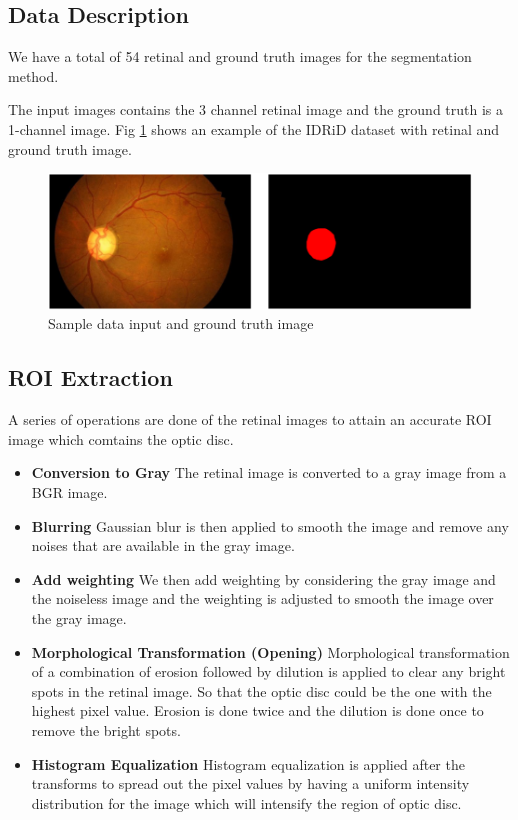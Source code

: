 \documentclass[conference]{IEEEtran}
\begin{document}
\subsection{Data Description}
\label{ssec:describe}
We have a total of 54 retinal and ground truth images for the segmentation method.

\par
The input images contains the 3 channel retinal image and the ground truth is a 1-channel image. Fig \ref{fig:example} shows an example of the IDRiD dataset with retinal and ground truth image.

\par              
\begin{figure}[H]
	\centering
	\includegraphics[width=\linewidth]{images/example.PNG}
	\caption{Sample data input and ground truth image}
	\label{fig:example}
\end{figure}

\subsection{ROI Extraction}
\label{ssec:roi}

A series of operations are done of the retinal images to attain an accurate ROI image which comtains the optic disc.

\begin{itemize}
		\item \textbf{Conversion to Gray} The retinal image is converted to a gray image from a BGR image.
		\item \textbf{Blurring} Gaussian blur is then applied to smooth the image and remove any noises that are available in the gray image.
		\item \textbf{Add weighting} We then add weighting by considering the gray image and the noiseless image and the weighting is adjusted to smooth the image over the gray image.
		\item \textbf{Morphological Transformation (Opening)} Morphological transformation of a combination of erosion followed by dilution is applied to clear any bright spots in the retinal image. So that the optic disc could be the one with the highest pixel value. Erosion is done twice and the dilution is done once to remove the bright spots.
		\item \textbf{Histogram Equalization} Histogram equalization is applied after the transforms to spread out the pixel values by having a uniform intensity distribution for the image which will intensify the region of optic disc.
\end{itemize}  
\end{document}
